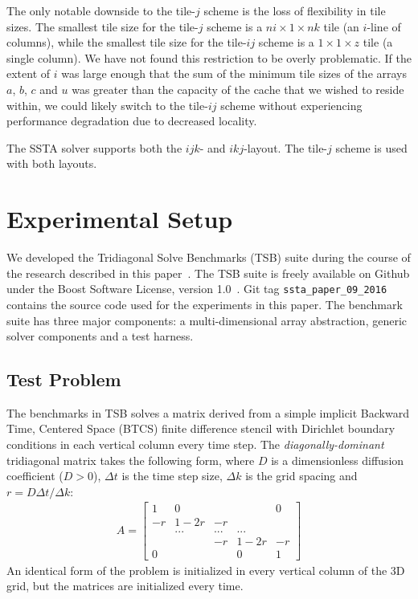 \documentclass{sig-alternate-05-2015}
\begin{document}
The only notable downside to the tile-\(j\) scheme is the loss of
  flexibility in tile sizes.
The smallest tile size for the tile-\(j\) scheme is a \(ni \times 1 \times nk\)
  tile (an \(i\)-line of columns), while the smallest tile size for the
  tile-\(ij\) scheme is a \(1 \times 1 \times z\) tile (a single column).
We have not found this restriction to be overly problematic.
If the extent of \(i\) was large enough that the sum of the minimum tile sizes of
  the arrays \(a\), \(b\), \(c\) and \(u\) was greater than the capacity of the
  cache that we wished to reside within, we could likely switch to the tile-\(ij\)
  scheme without experiencing performance degradation due to decreased locality.

The SSTA solver supports both the \(ijk\)- and \(ikj\)-layout.
The tile-\(j\) scheme is used with both layouts.

\section{Experimental Setup}
\label{sec:experimental_setup:}
We developed the Tridiagonal Solve Benchmarks (TSB) suite during the course of
  the research described in this paper~\cite{tsb_git}.
The TSB suite is freely available on Github under the Boost Software License,
  version 1.0~\cite{boost_license}.
Git tag \lstinline{ssta_paper_09_2016} contains the source code used for the
  experiments in this paper.
The benchmark suite has three major components: a multi-dimensional array
  abstraction, generic solver components and a test harness.

\subsection{Test Problem}
\label{sec:experimental_setup:test_problem}

The benchmarks in TSB solves a matrix derived from a simple implicit Backward
  Time, Centered Space (BTCS) finite difference stencil with Dirichlet boundary
  conditions in each vertical column every time step.
The \emph{diagonally-dominant} tridiagonal matrix takes the following form,
  where \(D\) is a dimensionless diffusion coefficient (\(D > 0\)), \(\Delta t\)
  is the time step size, \(\Delta k\) is the grid spacing and
  \(r=D \Delta t / \Delta k\):
\begin{align*}
A = 
\begin{bmatrix}
1   & 0      &     &        & 0  \\
-r  & 1 - 2r & -r  &        &    \\
    & ...    & ... & ...    &    \\
    &        & -r  & 1 - 2r & -r \\
0   &        &     & 0      & 1
\end{bmatrix}  
\end{align*}
An identical form of the problem is initialized in every vertical column of the
  3D grid, but the matrices are initialized every time.
\end{document}
